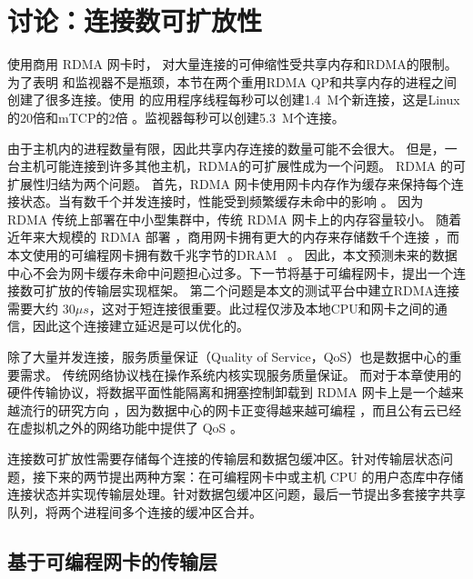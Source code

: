 \section{讨论：连接数可扩放性}
\label{socksdirect:sec:discussion}


使用商用 RDMA 网卡时，\sys {} 对大量连接的可伸缩性受共享内存和RDMA的限制。
为了表明 \libipc {} 和监视器不是瓶颈，本节在两个重用RDMA QP和共享内存的进程之间创建了很多连接。使用 \libipc {} 的应用程序线程每秒可以创建1.4~M个新连接，这是Linux的20倍和mTCP的2倍 \cite {jeong2014mtcp}。监视器每秒可以创建5.3~M个连接。

由于主机内的进程数量有限，因此共享内存连接的数量可能不会很大。
但是，一台主机可能连接到许多其他主机，RDMA的可扩展性成为一个问题。
RDMA 的可扩展性归结为两个问题。
首先，RDMA 网卡使用网卡内存作为缓存来保持每个连接状态。当有数千个并发连接时，性能受到频繁缓存未命中的影响 \cite {mprdma,kaminsky2016design,kalia2018datacenter}。
因为 RDMA 传统上部署在中小型集群中，传统 RDMA 网卡上的内存容量较小。
随着近年来大规模的 RDMA 部署 \cite {guo2016rdma}，商用网卡拥有更大的内存来存储数千个连接 \cite {kalia2018datacenter}，而本文使用的可编程网卡拥有数千兆字节的DRAM~ \cite {mellanox-innova,mellanox-bluefield,smartnic}。
因此，本文预测未来的数据中心不会为网卡缓存未命中问题担心过多。下一节将基于可编程网卡，提出一个连接数可扩放的传输层实现框架。
第二个问题是本文的测试平台中建立RDMA连接需要大约 $30 \mu s$，这对于短连接很重要。此过程仅涉及本地CPU和网卡之间的通信，因此这个连接建立延迟是可以优化的。

除了大量并发连接，服务质量保证（Quality of Service，QoS）也是数据中心的重要需求。
传统网络协议栈在操作系统内核实现服务质量保证。
而对于本章使用的硬件传输协议，将数据平面性能隔离和拥塞控制卸载到 RDMA 网卡上是一个越来越流行的研究方向 \cite {peter2016arrakis,zhu2015congestion,lu2017memory,mprdma,mittal2018revisiting}，因为数据中心的网卡正变得越来越可编程  \cite{smartnic,cavium,kaufmann2015flexnic,mellanox-innova,mellanox-bluefield}，而且公有云已经在虚拟机之外的网络功能中提供了 QoS \cite {li2016clicknp,panda2016netbricks,floem-osdi18}。

连接数可扩放性需要存储每个连接的传输层和数据包缓冲区。针对传输层状态问题，接下来的两节提出两种方案：在可编程网卡中或主机 CPU 的用户态库中存储连接状态并实现传输层处理。针对数据包缓冲区问题，最后一节提出多套接字共享队列，将两个进程间多个连接的缓冲区合并。

\subsection{基于可编程网卡的传输层}
\label{socksdirect:sec:smartnic}


